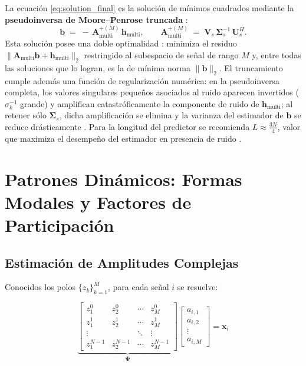 La ecuación \eqref{eq:solution_final} es la solución de mínimos cuadrados
mediante la \textbf{pseudoinversa de Moore--Penrose truncada}
\cite{brunton2022}:
\begin{equation}
    \mathbf{b}
    \;=\;
    -\,\mathbf{A}_{\mathrm{multi}}^{+(M)}\,\mathbf{h}_{\mathrm{multi}},
    \qquad
    \mathbf{A}_{\mathrm{multi}}^{+(M)}
    \;=\;
    \mathbf{V}_s\,\boldsymbol{\Sigma}_s^{-1}\,\mathbf{U}_s^H .
    \label{eq:pinv}
\end{equation}
Esta solución posee una doble optimalidad \cite{brunton2022}: minimiza el
residuo $\lVert \mathbf{A}_{\mathrm{multi}}\mathbf{b} +
\mathbf{h}_{\mathrm{multi}} \rVert_2$ restringido al subespacio de señal de
rango $M$ y, entre todas las soluciones que lo logran, es la de mínima
norma $\lVert\mathbf{b}\rVert_2$. El truncamiento cumple además una función
de regularización numérica: en la pseudoinversa completa, los valores
singulares pequeños asociados al ruido aparecen invertidos
($\sigma_k^{-1}$ grande) y amplifican catastróficamente la componente de
ruido de $\mathbf{h}_{\mathrm{multi}}$; al retener sólo
$\boldsymbol{\Sigma}_s$, dicha amplificación se elimina y la varianza del
estimador de $\mathbf{b}$ se reduce drásticamente
\cite{tufts1982,brunton2022}. Para la longitud del predictor se recomienda
$L \approx \tfrac{3N}{4}$, valor que maximiza el desempeño del estimador en
presencia de ruido \cite{tufts1982}.

\section{Patrones Dinámicos: Formas Modales y Factores de Participación}

\subsection{Estimación de Amplitudes Complejas}

Conocidos los polos $\{z_k\}_{k=1}^{M}$, para cada señal $i$ se resuelve:

\begin{equation}
\underbrace{
\begin{bmatrix}
    z_1^0 & z_2^0 & \cdots & z_M^0 \\
    z_1^1 & z_2^1 & \cdots & z_M^1 \\
    \vdots &      & \ddots & \vdots \\
    z_1^{N-1} & z_2^{N-1} & \cdots & z_M^{N-1}
\end{bmatrix}
}_{\boldsymbol{\Psi}}
\begin{bmatrix} a_{i,1} \\ a_{i,2} \\ \vdots \\ a_{i,M} \end{bmatrix}
= \mathbf{x}_i
\end{equation}

